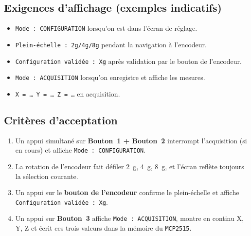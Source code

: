 \documentclass[11pt]{paper}
\begin{document}
\subsection{Exigences d'affichage (exemples indicatifs)}
\begin{itemize}
  \item \texttt{Mode : CONFIGURATION} lorsqu'on est dans l'écran de réglage.
  \item \texttt{Plein-échelle : 2g/4g/8g} pendant la navigation à l'encodeur.
  \item \texttt{Configuration validée : Xg} après validation par le bouton de l'encodeur.
  \item \texttt{Mode : ACQUISITION} lorsqu'on enregistre et affiche les mesures.
  \item \texttt{X = \dots\ Y = \dots\ Z = \dots} en acquisition.
\end{itemize}

\subsection{Critères d'acceptation}
\begin{enumerate}
  \item Un appui simultané sur \textbf{Bouton~1 + Bouton~2} interrompt l'acquisition (si en cours) et affiche \texttt{Mode : CONFIGURATION}.
  \item La rotation de l'encodeur fait défiler \SI{2}{g}, \SI{4}{g}, \SI{8}{g}, et l'écran reflète toujours la sélection courante.
  \item Un appui sur le \textbf{bouton de l'encodeur} confirme le plein-échelle et affiche \texttt{Configuration validée : Xg}.
  \item Un appui sur \textbf{Bouton~3} affiche \texttt{Mode : ACQUISITION}, montre en continu X, Y, Z et écrit ces trois valeurs dans la mémoire du \texttt{MCP2515}.
\end{enumerate}
\end{document}
